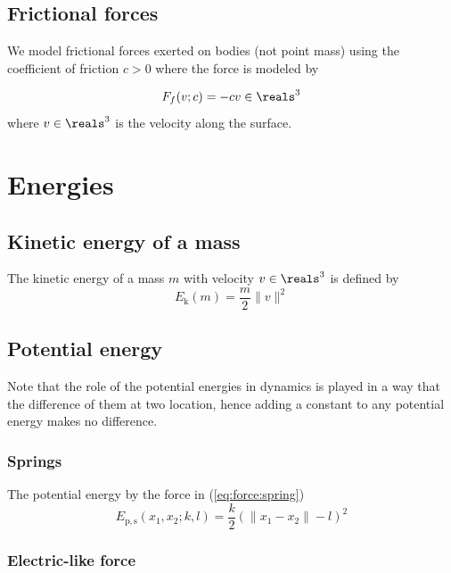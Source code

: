 \documentclass{article}
\begin{document}
\subsection{Frictional forces}
\label{subsection:frictional-forces}

We model frictional forces exerted on bodies (not point mass)
using the coefficient of friction $c>0$ where the force is modeled by

\begin{equation}
\label{eq:force:frictional}
F_f(v;c) = -c v
	\in\reals^3
\end{equation}
where $v\in\reals^3$ is the velocity along the surface.

\section{Energies}

\subsection{Kinetic energy of a mass}

The kinetic energy of a mass $m$ with velocity $v\in\reals^3$
is defined by
\begin{equation}
\label{eq:energy:kinetic}
	E_\mathrm{k}(m) = \frac{m}{2} \|v\|^2
\end{equation}

\subsection{Potential energy}

Note that the role of the potential energies in dynamics
is played in a way that the difference of them at two location,
hence adding a constant to any potential energy
makes no difference.

\subsubsection{Springs}

The potential energy by the force in (\ref{eq:force:spring})
\begin{equation}
\label{eq:energy:potential:spring}
E_\mathrm{p,s}(x_1,x_2;k,l)
= \frac{k}{2} (\|x_1-x_2\|-l)^2
\end{equation}

\subsubsection{Electric-like force}
\end{document}
